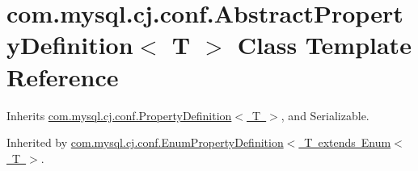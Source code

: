 \hypertarget{classcom_1_1mysql_1_1cj_1_1conf_1_1_abstract_property_definition}{}\section{com.\+mysql.\+cj.\+conf.\+Abstract\+Property\+Definition$<$ T $>$ Class Template Reference}
\label{classcom_1_1mysql_1_1cj_1_1conf_1_1_abstract_property_definition}


Inherits \mbox{\hyperlink{interfacecom_1_1mysql_1_1cj_1_1conf_1_1_property_definition}{com.\+mysql.\+cj.\+conf.\+Property\+Definition$<$ T $>$}}, and Serializable.



Inherited by \mbox{\hyperlink{classcom_1_1mysql_1_1cj_1_1conf_1_1_enum_property_definition}{com.\+mysql.\+cj.\+conf.\+Enum\+Property\+Definition$<$ T extends Enum$<$ T $>$}}.


